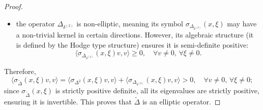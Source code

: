 \documentclass[10pt,a4paper]{amsart}
\begin{document}
\begin{proof}
\begin{itemize}
    \item the operator $\Delta_{\delta^{(2)}}$ is non-elliptic, meaning its symbol $\sigma_{\Delta_{\delta^{(2)}}}(x, \xi)$ may have a non-trivial kernel in certain directions. However, its algebraic structure (it is defined by the Hodge type structure) ensures it is semi-definite positive:
    \begin{equation}
    \langle \sigma_{\Delta_{\delta^{(2)}}}(x, \xi) v, v \rangle \geq 0, \quad \forall v \neq 0, \, \forall \xi \neq 0.
    \end{equation}
\end{itemize}
Therefore,
\begin{equation}
\langle \sigma_{\widetilde{\Delta}}(x, \xi) v, v \rangle = \langle \sigma_{\Delta^2}(x, \xi) v, v \rangle + \langle \sigma_{\Delta_{\delta^{(2)}}}(x, \xi) v, v \rangle > 0, \quad \forall v \neq 0, \, \forall \xi \neq 0;
\end{equation}
since $\sigma_{\widetilde{\Delta}}(x, \xi)$ is strictly positive definite, all its eigenvalues are strictly positive, ensuring it is invertible. This proves that $\widetilde{\Delta}$ is an elliptic operator.
\end{proof}
\end{document}
